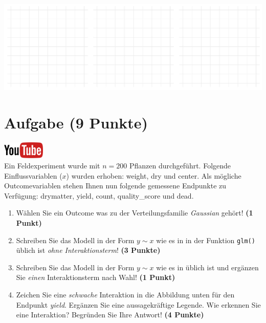 \documentclass[a4paper, 10pt]{scrartcl}\usepackage[]{graphicx}\usepackage[]{xcolor}
\makeatletter
\def\maxwidth{ %
  \ifdim\Gin@nat@width>\linewidth
    \linewidth
  \else
    \Gin@nat@width
  \fi
}
\makeatother
\begin{document}
{\centering \includegraphics[width=\maxwidth]{img/regression-01-1} 

}



 
\clearpage

\section{Aufgabe \hfill (9 Punkte)}

\hfill\href{https://youtu.be/AwQEcQWLFCw}{\includegraphics[width =
  2cm]{img/youtube}}\\[1Ex]



Ein Feldexperiment wurde mit $n = 200$ Pflanzen durchgef{\"u}hrt. Folgende
Einflussvariablen ($x$) wurden erhoben: weight, dry und center. Als m{\"o}gliche Outcomevariablen stehen Ihnen nun
folgende gemessene Endpunkte zu Verf{\"u}gung: drymatter, yield, count, quality\_score und dead.

\begin{enumerate}
\item W{\"a}hlen Sie ein Outcome was zu der Verteilungsfamilie
  \textit{Gaussian} geh{\"o}rt! \textbf{(1 Punkt)}
\item Schreiben Sie das Modell in der Form $y \sim x$ wie es in \Rlogo in
  der Funktion \texttt{glm()}
  {\"u}blich ist \textit{ohne Interaktionsterm}! \textbf{(3 Punkte)}
\item Schreiben Sie das Modell in der Form $y \sim x$ wie es in \Rlogo
  {\"u}blich ist und erg{\"a}nzen Sie \textit{einen} Interaktionsterm nach Wahl! \textbf{(1 Punkt)} 
\item Zeichen Sie eine \textit{schwache}
  Interaktion in die Abbildung unten f{\"u}r den Endpunkt
  \textit{yield}. Erg{\"a}nzen Sie eine aussagekr{\"a}ftige Legende. Wie erkennen
  Sie eine Interaktion? Begr{\"u}nden Sie Ihre Antwort! \textbf{(4 Punkte)}
\end{enumerate}
\end{document}
